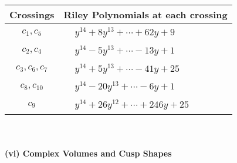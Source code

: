 \documentclass[1p]{elsarticle_modified}
\theoremstyle{definition}
\begin{document}
\begin{tabular}{m{50pt}|m{274pt}}
Crossings & \hspace{64pt}Riley Polynomials at each crossing \\
\hline $$\begin{aligned}c_{1},c_{5}\end{aligned}$$&$\begin{aligned}
&y^{14}+8 y^{13}+\cdots+62 y+9
\end{aligned}$\\
\hline $$\begin{aligned}c_{2},c_{4}\end{aligned}$$&$\begin{aligned}
&y^{14}-5 y^{13}+\cdots-13 y+1
\end{aligned}$\\
\hline $$\begin{aligned}c_{3},c_{6},c_{7}\end{aligned}$$&$\begin{aligned}
&y^{14}+5 y^{13}+\cdots-41 y+25
\end{aligned}$\\
\hline $$\begin{aligned}c_{8},c_{10}\end{aligned}$$&$\begin{aligned}
&y^{14}-20 y^{13}+\cdots-6 y+1
\end{aligned}$\\
\hline $$\begin{aligned}c_{9}\end{aligned}$$&$\begin{aligned}
&y^{14}+26 y^{12}+\cdots+246 y+25
\end{aligned}$\\
\hline
\end{tabular}\\~\\
\newpage\flushleft \textbf{(vi) Complex Volumes and Cusp Shapes}
\end{document}
